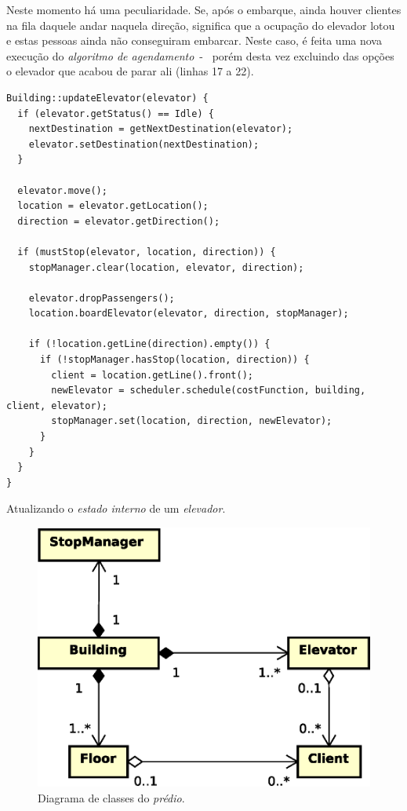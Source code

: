 \begin{description}
    Neste momento há uma peculiaridade. Se, após o embarque, ainda houver
    clientes na fila daquele andar naquela direção, significa que a ocupação do
    elevador lotou e estas pessoas ainda não conseguiram embarcar. Neste caso, é
    feita uma nova execução do \textit{algoritmo de agendamento}~-~ porém desta
    vez excluindo das opções o elevador que acabou de parar ali (linhas 17 a
    22).

    \begin{algorithm}[htb!]
      \centering
        \begin{verbatim}
Building::updateElevator(elevator) {
  if (elevator.getStatus() == Idle) {
    nextDestination = getNextDestination(elevator);
    elevator.setDestination(nextDestination);
  }

  elevator.move();
  location = elevator.getLocation();
  direction = elevator.getDirection();

  if (mustStop(elevator, location, direction)) {
    stopManager.clear(location, elevator, direction);

    elevator.dropPassengers();
    location.boardElevator(elevator, direction, stopManager);

    if (!location.getLine(direction).empty()) {
      if (!stopManager.hasStop(location, direction)) {
        client = location.getLine().front();
        newElevator = scheduler.schedule(costFunction, building, client, elevator);
        stopManager.set(location, direction, newElevator);
      }
    }
  }
}
        \end{verbatim}
      \caption{Atualizando o \textit{estado interno} de um \textit{elevador}.}
      \label{alg:building:state:update}
    \end{algorithm}
\end{description}

\begin{figure}[htb!]
  \centering
  \includegraphics[scale=0.6]{img/Building}
  \caption{Diagrama de classes do \textit{prédio}.}
\label{fig:diagram:model}
\end{figure}

